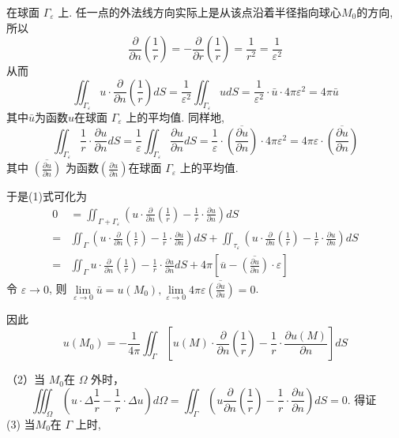 \begin{questions}
\begin{solution}
在球面 $ \Gamma_{\varepsilon} $ 上. 任一点的外法线方向实际上是从该点沿着半径指向球心$M_0$的方向, 所以 
$$ \frac{\partial}{\partial n}\left(\frac{1}{r}\right)=-\frac{\partial}{\partial r}\left(\frac{1}{r}\right)=\frac{1}{r^{2}}=\frac{1}{\varepsilon^{2}} $$
从而 
$$ \iint_{\Gamma_{\varepsilon}} u \cdot \frac{\partial}{\partial n}\left(\frac{1}{r}\right) d S=\frac{1}{\varepsilon^{2}} \iint_{\Gamma_{\varepsilon}} u d S=\frac{1}{\varepsilon^{2}} \cdot \bar{u} \cdot 4 \pi \varepsilon^{2}=4 \pi \bar{u} $$
其中$\bar{u}$为函数$u$在球面 $ \Gamma_{\varepsilon} $ 上的平均值.
同样地, $$ \iint_{\Gamma_{\varepsilon}} \frac{1}{r} \cdot \frac{\partial u}{\partial n} d S=\frac{1}{\varepsilon} \iint_{\Gamma_{\varepsilon}} \frac{\partial u}{\partial n} d S=\frac{1}{\varepsilon} \cdot\overline{\left(\frac{\partial u}{\partial n}\right)} \cdot 4 \pi \varepsilon^{2}=4 \pi \varepsilon \cdot\overline{\left(\frac{\partial u}{\partial n}\right)} $$ 其中 $ \overline{\left(\frac{{\partial u}}{\partial n}\right)} $ 为函数$\left(\frac{{\partial u}}{\partial n}\right)$在球面 $ \Gamma_{\varepsilon} $ 上的平均值.

于是(1)式可化为 
$$
\begin{aligned}
 0&=\iint_{\Gamma+\Gamma_{\varepsilon}}\left(u \cdot \frac{\partial}{\partial n}\left(\frac{1}{r}\right)-\frac 1 r \cdot \frac{\partial u}{\partial n}\right) d S\\
= & \iint_{\Gamma}\left(u \cdot \frac{\partial}{\partial n}\left(\frac{1}{r}\right)-\frac{1}{r} \cdot \frac{\partial u}{\partial n}\right) d S+\iint_{\tau_{\varepsilon}}\left(u \cdot \frac{\partial}{\partial n}\left(\frac{1}{r}\right)-\frac{1}{r}\cdot \frac{\partial u}{\partial n}\right) d S \\
= & \iint_{\Gamma} u \cdot \frac{\partial}{\partial n}\left(\frac{1}{r}\right)-\frac{1}{r} \cdot \frac{\partial u}{\partial n} d S+4 \pi\left[\overline{u}-\overline{\left(\frac{\partial u}{\partial n}\right)} \cdot \varepsilon\right]
\end{aligned}
$$
令 $ \varepsilon \rightarrow 0 $, 则 $ \lim\limits _{\varepsilon \rightarrow 0} \bar{u}=u\left(M_{0}\right), \lim \limits_{\varepsilon \rightarrow 0} 4 \pi \varepsilon\overline{\left(\frac{\partial u}{\partial u}\right)}=0 $.

因此 $$ u\left(M_{0}\right)=-\frac{1}{4 \pi} \iint_{\Gamma }\left[u(M) \cdot \frac{\partial}{\partial n}\left(\frac{1}{r}\right)-\frac{1}{r} \cdot \frac{\partial u(M)}{\partial n}\right]dS$$

（2）当 $M_0$在 $ \Omega $ 外时，
$$
\iiint_{\Omega}\left(u \cdot \Delta \frac{1}{r}-\frac{1}{r} \cdot \Delta u\right) d \Omega=\iint_{\Gamma}\left(u \frac{\partial}{\partial n}\left(\frac{1}{r}\right)-\frac{1}{r} \cdot \frac{\partial u}{\partial n}\right) d S=0 \text {. 得证 }
$$
(3) 当$M_0$在 $ \Gamma $ 上时, 


\end{solution}
\end{questions}

